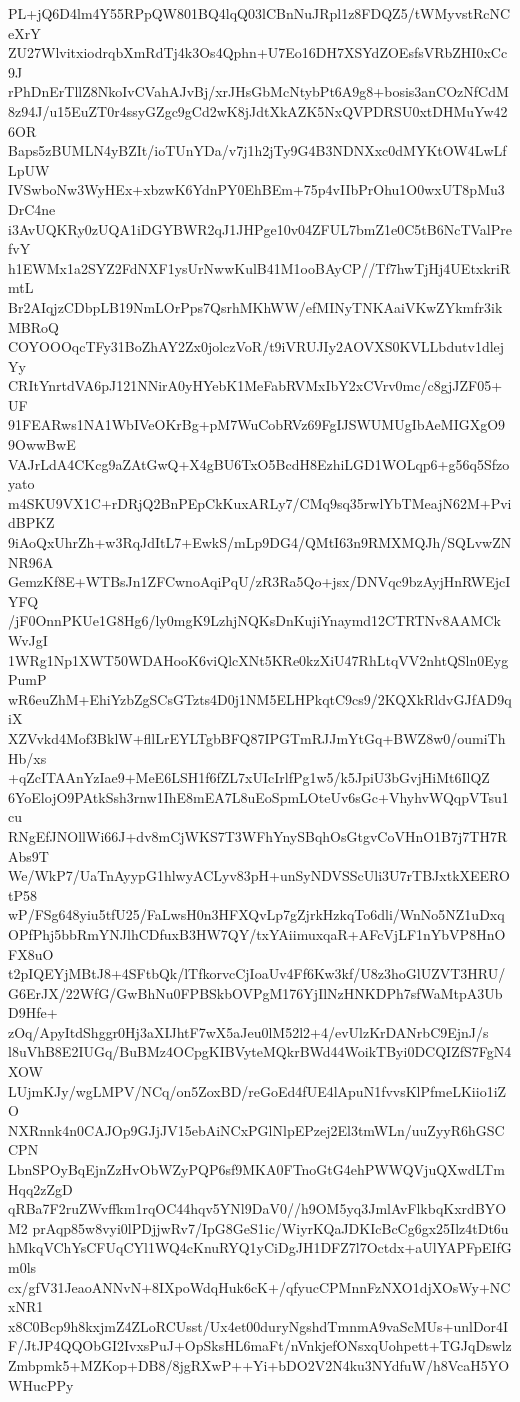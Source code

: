 PL+jQ6D4lm4Y55RPpQW801BQ4lqQ03lCBnNuJRpl1z8FDQZ5/tWMyvstRcNCeXrY
ZU27WlvitxiodrqbXmRdTj4k3Os4Qphn+U7Eo16DH7XSYdZOEsfsVRbZHI0xCc9J
rPhDnErTllZ8NkoIvCVahAJvBj/xrJHsGbMcNtybPt6A9g8+bosis3anCOzNfCdM
8z94J/u15EuZT0r4ssyGZgc9gCd2wK8jJdtXkAZK5NxQVPDRSU0xtDHMuYw426OR
Baps5zBUMLN4yBZIt/ioTUnYDa/v7j1h2jTy9G4B3NDNXxc0dMYKtOW4LwLfLpUW
IVSwboNw3WyHEx+xbzwK6YdnPY0EhBEm+75p4vIIbPrOhu1O0wxUT8pMu3DrC4ne
i3AvUQKRy0zUQA1iDGYBWR2qJ1JHPge10v04ZFUL7bmZ1e0C5tB6NcTValPrefvY
h1EWMx1a2SYZ2FdNXF1ysUrNwwKulB41M1ooBAyCP//Tf7hwTjHj4UEtxkriRmtL
Br2AIqjzCDbpLB19NmLOrPps7QsrhMKhWW/efMINyTNKAaiVKwZYkmfr3ikMBRoQ
COYOOOqcTFy31BoZhAY2Zx0jolczVoR/t9iVRUJIy2AOVXS0KVLLbdutv1dlejYy
CRItYnrtdVA6pJ121NNirA0yHYebK1MeFabRVMxIbY2xCVrv0mc/c8gjJZF05+UF
91FEARws1NA1WbIVeOKrBg+pM7WuCobRVz69FgIJSWUMUgIbAeMIGXgO99OwwBwE
VAJrLdA4CKcg9aZAtGwQ+X4gBU6TxO5BcdH8EzhiLGD1WOLqp6+g56q5Sfzoyato
m4SKU9VX1C+rDRjQ2BnPEpCkKuxARLy7/CMq9sq35rwlYbTMeajN62M+PvidBPKZ
9iAoQxUhrZh+w3RqJdItL7+EwkS/mLp9DG4/QMtI63n9RMXMQJh/SQLvwZNNR96A
GemzKf8E+WTBsJn1ZFCwnoAqiPqU/zR3Ra5Qo+jsx/DNVqc9bzAyjHnRWEjcIYFQ
/jF0OnnPKUe1G8Hg6/ly0mgK9LzhjNQKsDnKujiYnaymd12CTRTNv8AAMCkWvJgI
1WRg1Np1XWT50WDAHooK6viQlcXNt5KRe0kzXiU47RhLtqVV2nhtQSln0EygPumP
wR6euZhM+EhiYzbZgSCsGTzts4D0j1NM5ELHPkqtC9cs9/2KQXkRldvGJfAD9qiX
XZVvkd4Mof3BklW+fllLrEYLTgbBFQ87IPGTmRJJmYtGq+BWZ8w0/oumiThHb/xs
+qZcITAAnYzIae9+MeE6LSH1f6fZL7xUIcIrlfPg1w5/k5JpiU3bGvjHiMt6IlQZ
6YoElojO9PAtkSsh3rnw1IhE8mEA7L8uEoSpmLOteUv6sGc+VhyhvWQqpVTsu1cu
RNgEfJNOllWi66J+dv8mCjWKS7T3WFhYnySBqhOsGtgvCoVHnO1B7j7TH7RAbs9T
We/WkP7/UaTnAyypG1hlwyACLyv83pH+unSyNDVSScUli3U7rTBJxtkXEEROtP58
wP/FSg648yiu5tfU25/FaLwsH0n3HFXQvLp7gZjrkHzkqTo6dli/WnNo5NZ1uDxq
OPfPhj5bbRmYNJlhCDfuxB3HW7QY/txYAiimuxqaR+AFcVjLF1nYbVP8HnOFX8uO
t2pIQEYjMBtJ8+4SFtbQk/lTfkorvcCjIoaUv4Ff6Kw3kf/U8z3hoGlUZVT3HRU/
G6ErJX/22WfG/GwBhNu0FPBSkbOVPgM176YjIlNzHNKDPh7sfWaMtpA3UbD9Hfe+
zOq/ApyItdShggr0Hj3aXIJhtF7wX5aJeu0lM52l2+4/evUlzKrDANrbC9EjnJ/s
l8uVhB8E2IUGq/BuBMz4OCpgKIBVyteMQkrBWd44WoikTByi0DCQIZfS7FgN4XOW
LUjmKJy/wgLMPV/NCq/on5ZoxBD/reGoEd4fUE4lApuN1fvvsKlPfmeLKiio1iZO
NXRnnk4n0CAJOp9GJjJV15ebAiNCxPGlNlpEPzej2El3tmWLn/uuZyyR6hGSCCPN
LbnSPOyBqEjnZzHvObWZyPQP6sf9MKA0FTnoGtG4ehPWWQVjuQXwdLTmHqq2zZgD
qRBa7F2ruZWvffkm1rqOC44hqv5YNl9DaV0//h9OM5yq3JmlAvFlkbqKxrdBYOM2
prAqp85w8vyi0lPDjjwRv7/IpG8GeS1ic/WiyrKQaJDKIcBcCg6gx25Ilz4tDt6u
hMkqVChYsCFUqCYl1WQ4cKnuRYQ1yCiDgJH1DFZ7l7Octdx+aUlYAPFpEIfGm0ls
cx/gfV31JeaoANNvN+8IXpoWdqHuk6cK+/qfyucCPMnnFzNXO1djXOsWy+NCxNR1
x8C0Bcp9h8kxjmZ4ZLoRCUsst/Ux4et00duryNgshdTmnmA9vaScMUs+unlDor4I
F/JtJP4QQObGI2IvxsPuJ+OpSksHL6maFt/nVnkjefONsxqUohpett+TGJqDswlz
Zmbpmk5+MZKop+DB8/8jgRXwP++Yi+bDO2V2N4ku3NYdfuW/h8VcaH5YOWHucPPy
